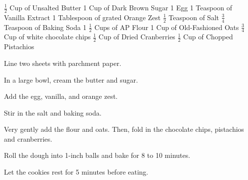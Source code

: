 \begin{ingreds}
     \(\frac{1}{2}\) Cup of Unsalted Butter
     1 Cup of Dark Brown Sugar
     1 Egg
     1 Teaspoon of Vanilla Extract 
     1 Tablespoon of grated Orange Zest
     \(\frac{1}{2}\) Teaspoon of Salt
     \(\frac{3}{4}\) Teaspoon of Baking Soda
     1 \(\frac{1}{2}\) Cups of AP Flour
     1 Cup of Old-Fashioned Oats
     \(\frac{3}{4}\) Cup of white chocolate chips
     \(\frac{1}{2}\) Cup of Dried Cranberries
     \(\frac{1}{2}\) Cup of Chopped Pistachios
\end{ingreds}
\vspace{.5in}
\begin{method}
Line two sheets with parchment paper.

In a large bowl, cream the butter and sugar.

Add the egg, vanilla, and orange zest.

Stir in the salt and baking soda.

Very gently add the flour and oats. Then, fold in the chocolate chips, pistachios and cranberries.

Roll the dough into 1-inch balls and bake for 8 to 10 minutes.

Let the cookies rest for 5 minutes before eating.
\end{method}